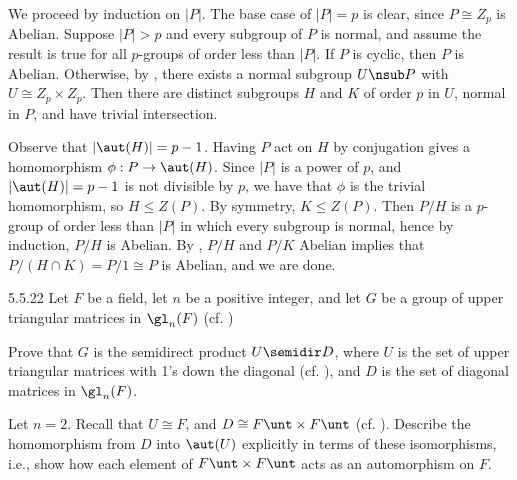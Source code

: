 \begin{sol}[spsol]
    We proceed by induction on $|P|$.
    The base case of $|P| = p$ is clear, since $P \cong Z_p$ is Abelian.
    Suppose $|P| > p$ and every subgroup of $P$ is normal, and assume the result is true for all $p$-groups of order less than $|P|$.
    If $P$ is cyclic, then $P$ is Abelian.
    Otherwise, by , there exists a normal subgroup $U \nsub P$ with $U \cong Z_p \times Z_p$.
    Then there are distinct subgroups $H$ and $K$ of order $p$ in $U$, normal in $P$, and have trivial intersection.

    Observe that $|\aut(H)| = p - 1$.
    Having $P$ act on $H$ by conjugation gives a homomorphism $\phi : P \to \aut(H)$.
    Since $|P|$ is a power of $p$, and $|\aut(H)| = p - 1$ is not divisible by $p$, we have that $\phi$ is the trivial homomorphism, so $H \leq Z(P)$.
    By symmetry, $K \leq Z(P)$.
    Then $P/H$ is a $p$-group of order less than $|P|$ in which every subgroup is normal, hence by induction, $P/H$ is Abelian.
    By , $P/H$ and $P/K$ Abelian implies that $P/(H \cap K) = P/1 \cong P$ is Abelian, and we are done.
\end{sol}

\begin{exercise}{5.5.22}
    Let $F$ be a field, let $n$ be a positive integer, and let $G$ be a group of upper triangular matrices in $\gl_n(F)$ (cf. )
    \begin{subexercises}
        \item Prove that $G$ is the semidirect product $U \semidir D$, where $U$ is the set of upper triangular matrices with 1's down the diagonal (cf. ), and $D$ is the set of diagonal matrices in $\gl_n(F)$.
        \item Let $n = 2$.
	    Recall that $U \cong F$, and $D \cong F\unt \times F\unt$ (cf. ).
	    Describe the homomorphism from $D$ into $\aut(U)$ explicitly in terms of these isomorphisms, i.e., show how each element of $F\unt \times F\unt$ acts as an automorphism on $F$.
    \end{subexercises}
\end{exercise}

